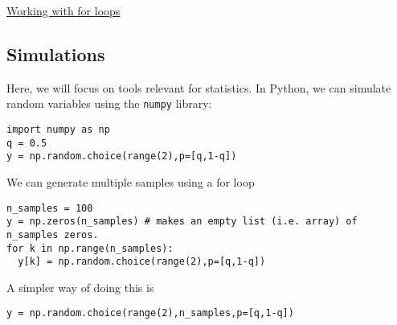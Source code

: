 \begin{exercise}
\href{https://colab.research.google.com/drive/1Gs-gSsUP1hHVwhrbwvWzLVm1ulcLJKRI#scrollTo=_c4br6SCUtUy}{Working with for loops}
\end{exercise}
%


\subsection{Simulations}
 Here, we will focus on tools relevant for statistics. In Python, we can simulate random variables using the \verb|numpy| library:
\begin{Verbatim}
import numpy as np
q = 0.5
y = np.random.choice(range(2),p=[q,1-q])
 \end{Verbatim}
 We can generate multiple samples using a for loop
\begin{Verbatim}
n_samples = 100
y = np.zeros(n_samples) # makes an empty list (i.e. array) of n_samples zeros.
for k in np.range(n_samples):
  y[k] = np.random.choice(range(2),p=[q,1-q])
 \end{Verbatim}
A simpler way of doing this is
\begin{Verbatim}
y = np.random.choice(range(2),n_samples,p=[q,1-q])
 \end{Verbatim}


